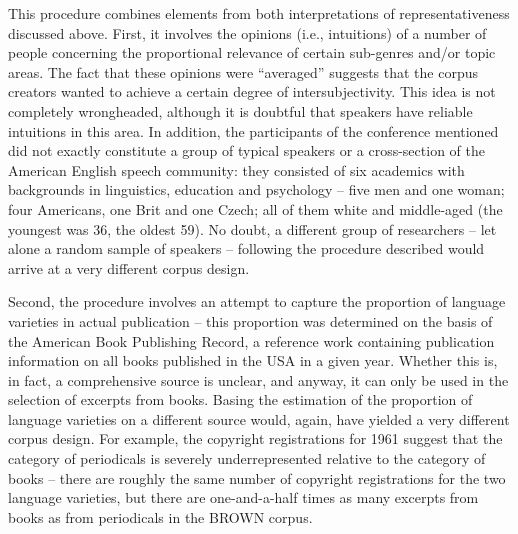 This procedure combines elements from both interpretations of representativeness discussed above. First, it involves the opinions (i.e., intuitions)  of a number of people concerning the proportional relevance of certain sub\hyp{}genres  and\slash or topic areas. The fact that these opinions were ``averaged'' suggests that the corpus creators wanted to achieve a certain degree of intersubjectivity. This idea is not completely wrongheaded, although it is doubtful that speakers have reliable  intuitions in this area. In addition, the participants of the conference mentioned did not exactly constitute a group of typical speakers or a cross\hyp{}section of the American  English speech community: they consisted of six academics with backgrounds in linguistics, education and psychology  -- five men and one woman; four Americans, one Brit and one Czech; all of them white and middle\hyp{}aged (the youngest was 36, the oldest 59). No doubt, a different group of researchers -- let alone a random  sample  of speakers -- following the procedure described would arrive at a very different corpus  design.

Second, the procedure involves an attempt to capture the proportion of language varieties  in actual publication -- this proportion was determined on the basis of the American  Book Publishing Record, a reference work containing publication information on all books published in the USA in a given year. Whether this is, in fact, a comprehensive source is unclear, and anyway, it can only be used in the selection of excerpts from books. Basing the estimation of the proportion of language varieties on a different source would, again, have yielded a very different corpus design.  For example, the copyright registrations for 1961 suggest that the category of periodicals is severely underrepresented  relative to the category of books -- there are roughly the same number of copyright registrations for the two language varieties,  but there are one\hyp{}and\hyp{}a\hyp{}half times as many excerpts from books as from periodicals in the BROWN  corpus.

